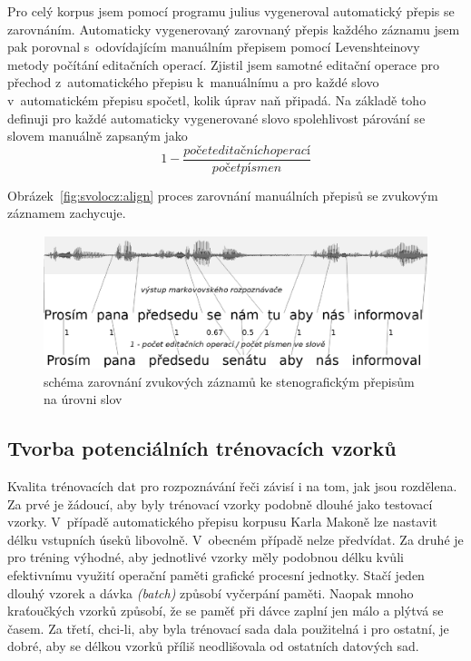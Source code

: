Pro celý korpus jsem pomocí programu julius vygeneroval automatický přepis se
zarovnáním. Automaticky vygenerovaný zarovnaný přepis každého záznamu jsem pak
porovnal s~odovídajícím manuálním přepisem pomocí Levenshteinovy metody počítání
editačních operací. Zjistil jsem samotné editační operace pro přechod
z~automatického přepisu k~manuálnímu a pro každé slovo v~automatickém přepisu
spočetl, kolik úprav naň připadá. Na základě toho definuji pro každé automaticky
vygenerované slovo spolehlivost párování se slovem manuálně zapsaným jako
\begin{equation}1 - \frac{počet editačních operací}{počet písmen}\end{equation}

Obrázek~\ref{fig:svolocz:align} proces zarovnání manuálních přepisů se zvukovým
záznamem zachycuje.

\begin{figure}[htpb]
\includegraphics[scale=0.4]{rc/svolocz-align.eps}
\caption{schéma zarovnání zvukových záznamů ke stenografickým přepisům na úrovni
slov}
\label{fig:align}
\end{figure}

\subsection{Tvorba potenciálních trénovacích vzorků}

Kvalita trénovacích dat pro rozpoznávání řeči závisí i na tom, jak jsou
rozdělena. Za prvé je žádoucí, aby byly trénovací vzorky podobně dlouhé
jako testovací vzorky. V~případě automatického přepisu korpusu Karla Makoně lze
nastavit délku vstupních úseků libovolně. V~obecném případě nelze předvídat.
Za druhé je pro tréning výhodné, aby jednotlivé vzorky měly podobnou délku kvůli
efektivnímu využití operační paměti grafické procesní jednotky. Stačí jeden
dlouhý vzorek a dávka {\em (batch)} způsobí vyčerpání paměti. Naopak mnoho
kraťoučkých vzorků způsobí, že se paměť při dávce zaplní jen málo a plýtvá se
časem. Za třetí, chci-li, aby byla trénovací sada dala použitelná i pro ostatní,
je dobré, aby se délkou vzorků příliš neodlišovala od ostatních datových sad.

%
